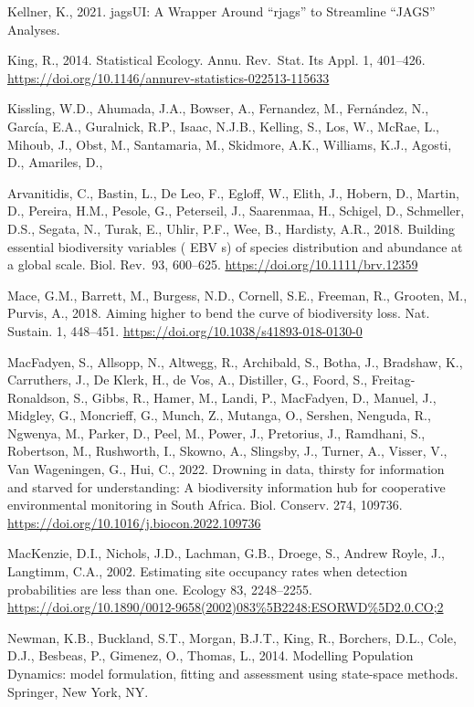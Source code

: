 \documentclass[utf8]{frontiersSCNS}
\begin{document}
Kellner, K., 2021. jagsUI: A Wrapper Around ``rjags'' to Streamline
``JAGS'' Analyses.

King, R., 2014. Statistical Ecology. Annu. Rev.~Stat. Its Appl. 1,
401--426. \url{https://doi.org/10.1146/annurev-statistics-022513-115633}

Kissling, W.D., Ahumada, J.A., Bowser, A., Fernandez, M., Fernández, N.,
García, E.A., Guralnick, R.P., Isaac, N.J.B., Kelling, S., Los, W.,
McRae, L., Mihoub, J., Obst, M., Santamaria, M., Skidmore, A.K.,
Williams, K.J., Agosti, D., Amariles, D.,

Arvanitidis, C., Bastin, L., De Leo, F., Egloff, W., Elith, J., Hobern,
D., Martin, D., Pereira, H.M., Pesole, G., Peterseil, J., Saarenmaa, H.,
Schigel, D., Schmeller, D.S., Segata, N., Turak, E., Uhlir, P.F., Wee,
B., Hardisty, A.R., 2018. Building essential biodiversity variables (
EBV s) of species distribution and abundance at a global scale. Biol.
Rev.~93, 600--625. \url{https://doi.org/10.1111/brv.12359}

Mace, G.M., Barrett, M., Burgess, N.D., Cornell, S.E., Freeman, R.,
Grooten, M., Purvis, A., 2018. Aiming higher to bend the curve of
biodiversity loss. Nat. Sustain. 1, 448--451.
\url{https://doi.org/10.1038/s41893-018-0130-0}

MacFadyen, S., Allsopp, N., Altwegg, R., Archibald, S., Botha, J.,
Bradshaw, K., Carruthers, J., De Klerk, H., de Vos, A., Distiller, G.,
Foord, S., Freitag-Ronaldson, S., Gibbs, R., Hamer, M., Landi, P.,
MacFadyen, D., Manuel, J., Midgley, G., Moncrieff, G., Munch, Z.,
Mutanga, O., Sershen, Nenguda, R., Ngwenya, M., Parker, D., Peel, M.,
Power, J., Pretorius, J., Ramdhani, S., Robertson, M., Rushworth, I.,
Skowno, A., Slingsby, J., Turner, A., Visser, V., Van Wageningen, G.,
Hui, C., 2022. Drowning in data, thirsty for information and starved for
understanding: A biodiversity information hub for cooperative
environmental monitoring in South Africa. Biol. Conserv. 274, 109736.
\url{https://doi.org/10.1016/j.biocon.2022.109736}

MacKenzie, D.I., Nichols, J.D., Lachman, G.B., Droege, S., Andrew Royle,
J., Langtimm, C.A., 2002. Estimating site occupancy rates when detection
probabilities are less than one. Ecology 83, 2248--2255.
\url{https://doi.org/10.1890/0012-9658(2002)083\%5B2248:ESORWD\%5D2.0.CO;2}

Newman, K.B., Buckland, S.T., Morgan, B.J.T., King, R., Borchers, D.L.,
Cole, D.J., Besbeas, P., Gimenez, O., Thomas, L., 2014. Modelling
Population Dynamics: model formulation, fitting and assessment using
state-space methods. Springer, New York, NY.
\end{document}
